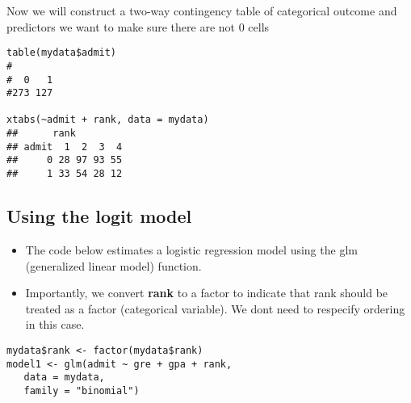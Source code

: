 \documentclass[]{article}
\begin{document}
\begin{framed}
Now we will construct a two-way contingency table of categorical outcome and predictors we want to make sure there are not 0 cells
\begin{verbatim}
table(mydata$admit)
#
#  0   1 
#273 127 

xtabs(~admit + rank, data = mydata)
##      rank
## admit  1  2  3  4
##     0 28 97 93 55
##     1 33 54 28 12
\end{verbatim}
\end{framed}
\newpage
\subsection{Using the logit model}
\begin{itemize}
\item The code below estimates a logistic regression model using the glm (generalized linear model) function. \item Importantly, we convert \textbf{rank} to a factor to indicate that rank should be treated as a factor (categorical variable). We dont need to respecify ordering in this case.
\end{itemize}

\begin{framed}
\begin{verbatim}
mydata$rank <- factor(mydata$rank)
model1 <- glm(admit ~ gre + gpa + rank, 
   data = mydata, 
   family = "binomial")
\end{verbatim}
\end{framed}
\newpage
\end{document}
